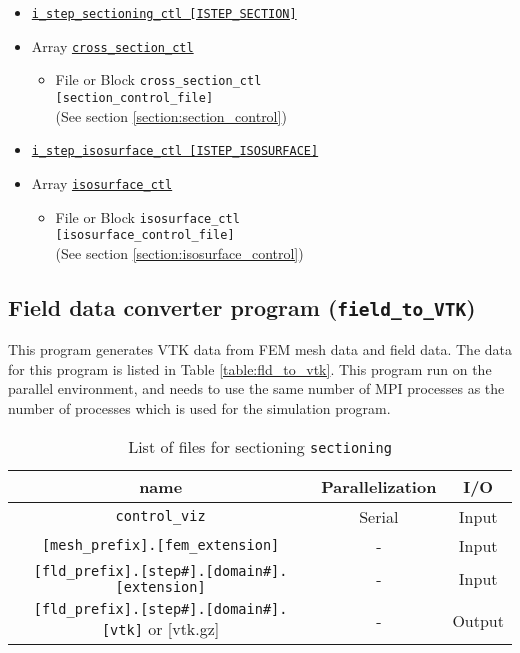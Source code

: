 \begin{itemize}
    \begin{itemize} \label{href_i:visual_control_v}
    \item \hyperref[href_t:i_step_sectioning_ctl]
        {\tt i\_step\_sectioning\_ctl  [ISTEP\_SECTION]}
    \item Array \hyperref[href_t:cross_section_ctl]{\tt cross\_section\_ctl}
		\begin{itemize}
        \item File or Block {\tt cross\_section\_ctl} \\
                            {\tt [section\_control\_file]} \\
								(See section \ref{section:section_control})
		\end{itemize}
%
    \item \hyperref[href_t:i_step_isosurface_ctl]
		{\tt i\_step\_isosurface\_ctl  [ISTEP\_ISOSURFACE]}
    \item Array \hyperref[href_t:isosurface_ctl]{\tt isosurface\_ctl}
		\begin{itemize}
		\item File or Block {\tt isosurface\_ctl} \\
                            {\tt [isosurface\_control\_file]} \\
								(See section \ref{section:isosurface_control})
		\end{itemize}
    \end{itemize}
\end{itemize}
%

\subsection{Field data converter program ({\tt field\_to\_VTK})}
\label{sec:field_to_VTK}
This program generates VTK data from FEM mesh data and field data. The data for this program is listed in Table \ref{table:fld_to_vtk}. This program run on the parallel environment, and needs to use the same number of MPI processes as the number of processes which is used for the simulation program.
%
\begin{table}[htp]
\caption{List of files for sectioning {\tt sectioning} }
\begin{center} 
\begin{tabular}{|c|c|c|}
\hline
name & Parallelization & I/O \\ \hline \hline
\verb|control_viz| & Serial & Input \\ \hline
\verb|[mesh_prefix].[fem_extension]| & - & Input \\ \hline
\verb|[fld_prefix].[step#].[domain#].[extension]| & - & Input  \\ \hline
\verb|[fld_prefix].[step#].[domain#].[vtk]| or [vtk.gz] & - & Output  \\ \hline
\end{tabular}
\end{center}
\label{table:sectioning}
\end{table}
%

